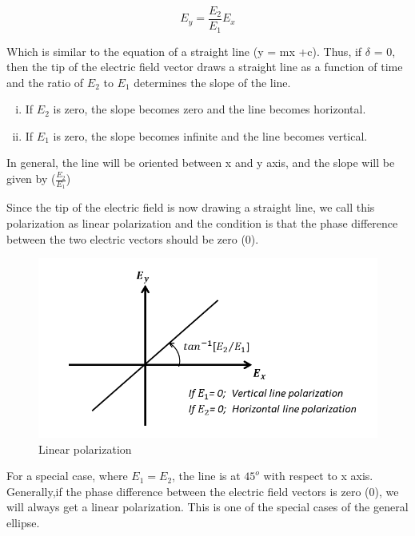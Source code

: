 \begin{equation}
E_y = \frac{E_2}{E_1}E_x
\end{equation}

Which is similar to the equation of a straight line (y = mx +c). Thus, if $\delta$ = 0, then the tip of the electric field vector draws a straight line as a function of time and the ratio of $ E_2 $ to $ E_1 $ determines the slope of the line.
\begin{enumerate}[(i)]
\item If $ E_2 $ is zero, the slope becomes zero and the line becomes horizontal.
\item If $ E_1 $ is zero, the slope becomes infinite and the line becomes vertical.
\end{enumerate} 
In general, the line will be oriented between x and y axis, and the slope will be given by ($\frac{E_2}{E_1}$)

Since the tip of the electric field is now drawing a straight line, we call this polarization as linear polarization and the condition is that the phase difference between the two electric vectors should be zero (0).
\begin{figure}[h]
\centering
\includegraphics[width=1\linewidth]{./graphics/linear_polarization}
\caption{Linear polarization}
\end{figure}

For a special case, where $  E_1=E_2 $, the line is at $ 45^{o}$ with respect to x axis.
Generally,if the phase difference between the electric field vectors is zero (0), we will always get a linear polarization. This is one of the special cases of the general ellipse.

